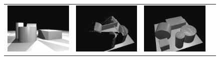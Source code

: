 \newcommand{\turnheight}{0.23\columnwidth}
\begin{figure}
\begin{tabular}{cccc}
\includegraphics[height=\turnheight]{umk4nke6pzebef2b_SEQ_input.png} &
\includegraphics[height=\turnheight]{umk4nke6pzebef2b_SEQ_visible.png} &
\includegraphics[height=\turnheight]{umk4nke6pzebef2b_SEQ_gt.png} &

\end{tabular}
\end{figure}
